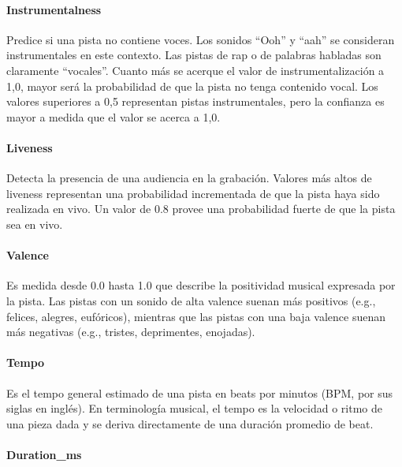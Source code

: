 \documentclass[
  letterpaper,
  DIV=11,
  numbers=noendperiod]{scrartcl}
\let\oldparagraph\paragraph
\renewcommand{\paragraph}[1]{\oldparagraph{#1}\mbox{}}
\begin{document}
\hypertarget{instrumentalness}{%
\paragraph{Instrumentalness}\label{instrumentalness}}

Predice si una pista no contiene voces. Los sonidos ``Ooh'' y ``aah'' se
consideran instrumentales en este contexto. Las pistas de rap o de
palabras habladas son claramente ``vocales''. Cuanto más se acerque el
valor de instrumentalización a 1,0, mayor será la probabilidad de que la
pista no tenga contenido vocal. Los valores superiores a 0,5 representan
pistas instrumentales, pero la confianza es mayor a medida que el valor
se acerca a 1,0.

\hypertarget{liveness}{%
\paragraph{Liveness}\label{liveness}}

Detecta la presencia de una audiencia en la grabación. Valores más altos
de liveness representan una probabilidad incrementada de que la pista
haya sido realizada en vivo. Un valor de 0.8 provee una probabilidad
fuerte de que la pista sea en vivo.

\hypertarget{valence}{%
\paragraph{Valence}\label{valence}}

Es medida desde 0.0 hasta 1.0 que describe la positividad musical
expresada por la pista. Las pistas con un sonido de alta valence suenan
más positivos (e.g., felices, alegres, eufóricos), mientras que las
pistas con una baja valence suenan más negativas (e.g., tristes,
deprimentes, enojadas).

\hypertarget{tempo}{%
\paragraph{Tempo}\label{tempo}}

Es el tempo general estimado de una pista en beats por minutos (BPM, por
sus siglas en inglés). En terminología musical, el tempo es la velocidad
o ritmo de una pieza dada y se deriva directamente de una duración
promedio de beat.

\hypertarget{duration_ms}{%
\paragraph{Duration\_ms}\label{duration_ms}}
\end{document}
